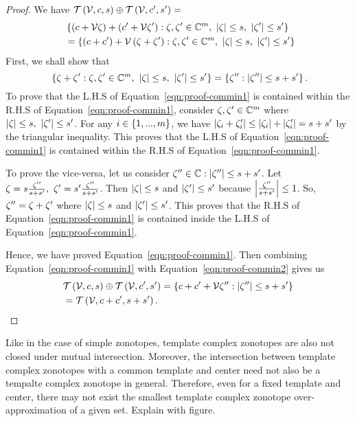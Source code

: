 \begin{proof}
We have $\mathit{\mathcal{T}}\left(\mathcal{V},c,s\right)\oplus \mathit{\mathcal{T}}\left(\mathcal{V},c^\prime,s^\prime\right)=$
%
\begin{align}~\label{eqn:proof-commin2}
&
\left\{\left(c+\mathcal{V}\zeta\right)+\left(c^\prime+\mathcal{V}\zeta^\prime\right):\zeta,\zeta^\prime\in\mathbb{C}^m,~\left|\zeta\right|\leq
s,~\left|\zeta^\prime\right|\leq s^\prime\right\}\nonumber\\
& = \left\{\left(c+c^\prime\right)+\mathcal{V}\left(\zeta+\zeta^\prime\right):\zeta,\zeta^\prime\in\mathbb{C}^m,~\left|\zeta\right|\leq
s,~\left|\zeta^\prime\right|\leq s^\prime\right\}
\end{align}
%
First, we shall show that
\begin{equation}~\label{eqn:proof-commin1}
\left\{\zeta+\zeta^\prime:\zeta,\zeta^\prime\in\mathbb{C}^m,~\left|\zeta\right|\leq
s,~\left|\zeta^\prime\right|\leq s^\prime\right\}=\left\{\zeta^{\prime\prime}:\left|\zeta^{\prime\prime}\right|\leq s+s^\prime \right\}.
\end{equation}
%
To prove that the L.H.S of Equation~\ref{eqn:proof-commin1} is
contained within the R.H.S of Equation~\ref{eqn:proof-commin1},
consider $\zeta,\zeta^\prime\in\mathbb{C}^m$ where $\left|\zeta\right|\leq
s,~\left|\zeta^\prime\right|\leq s^\prime$.  For any
$i\in\left\{1,...,m\right\}$, we have
$\left|\zeta_i+\zeta^\prime_i\right|\leq \left|\zeta_i\right|+\left|\zeta^\prime_i\right|=s+s^\prime$
by the triangular inequality.  This proves that the L.H.S of
Equation~\ref{eqn:proof-commin1} is contained within the R.H.S of
Equation~\ref{eqn:proof-commin1}.

To prove the vice-versa, let us
consider
$\zeta^{\prime\prime}\in\mathbb{C}:\left|\zeta^{\prime\prime}\right|\leq s+s^\prime$.
Let
$\zeta=s\frac{\zeta^{\prime\prime}}{s+s^\prime},~\zeta^\prime=s^\prime\frac{\zeta^{\prime\prime}}{s+s^\prime}$.
Then $\left|\zeta\right|\leq s$ and
$\left|\zeta^\prime\right|\leq s^\prime$ because
$\left|\frac{\zeta^{\prime\prime}}{s+s^\prime}\right|\leq 1$.  So,
$\zeta^{\prime\prime}=\zeta+\zeta^\prime$ where $\left|\zeta\right|\leq s$ and
$\left|\zeta^\prime\right|\leq s^\prime$.  This proves that the R.H.S of
Equation~\ref{eqn:proof-commin1}  is contained inside the L.H.S of
Equation~\ref{eqn:proof-commin1}.

Hence, we have proved Equation~\ref{eqn:proof-commin1}.  Then combining 
Equation~\ref{eqn:proof-commin1}  with
Equation~\ref{eqn:proof-commin2} gives us
%
\begin{align*}
&\mathit{\mathcal{T}}\left(\mathcal{V},c,s\right)\oplus \mathit{\mathcal{T}}\left(\mathcal{V},c^\prime,s^\prime\right)=\left\{c+c^\prime+\mathcal{V}\zeta^{\prime\prime}:\left|\zeta^{\prime\prime}\right|\leq s+s^\prime\right\}\\
&=\mathit{\mathcal{T}}\left(\mathcal{V},c+c^\prime,s+s^\prime\right).
\end{align*}
%
\end{proof}
%
Like in the case of simple zonotopes, template complex zonotopes are
also not closed under mutual intersection.  Moreover, the intersection
between template complex zonotopes with a common template and center
need not also be a tempalte complex zonotope in general.  Therefore,
even for a fixed template and center, there may not exist the smallest template
complex zonotope over-approximation of a given set. {\color{red} Explain
with figure}.

